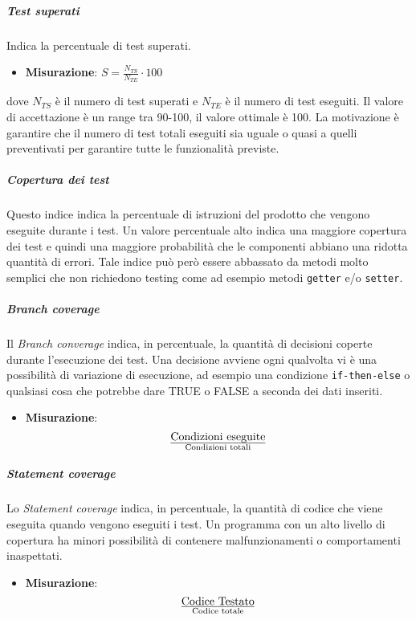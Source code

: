 \subparagraph{Test superati}

Indica la percentuale di test superati.
\begin{itemize}
	\item \textbf{Misurazione}: $S=\frac{N_{TS}}{N_{TE}} \cdot 100$
\end{itemize}
dove $N_{TS}$ è il numero di test superati e $N_{TE}$ è il numero di test eseguiti.
Il valore di accettazione è un range tra 90-100, il valore ottimale è 100. La motivazione è  garantire che il numero di test totali eseguiti sia uguale o quasi a quelli preventivati per garantire tutte le funzionalità previste. \\

\subparagraph{Copertura dei test}
Questo indice indica la percentuale di istruzioni del prodotto che vengono eseguite durante i test.
Un valore percentuale alto indica una maggiore copertura dei test e quindi una maggiore probabilità che le componenti abbiano una ridotta quantità di errori.
Tale indice può però essere abbassato da metodi molto semplici che non richiedono testing come ad esempio metodi \texttt{getter} e/o \texttt{setter}.

\subparagraph{Branch coverage}
Il \textit{Branch converage} indica, in percentuale, la quantità di decisioni coperte durante l'esecuzione dei test. Una decisione avviene ogni qualvolta vi è una possibilità di variazione di esecuzione, ad esempio una condizione \texttt{if-then-else} o qualsiasi cosa che potrebbe dare TRUE o FALSE a seconda dei dati inseriti.
\begin{itemize}
	\item \textbf{Misurazione}:
	\begin{displaymath}
	{\text{Condizioni eseguite}}\over{\text{Condizioni totali}}
	\end{displaymath} 
\end{itemize}

\subparagraph{Statement coverage}
Lo \textit{Statement coverage} indica, in percentuale, la quantità di codice che viene eseguita quando vengono eseguiti i test. Un programma con un alto livello di copertura ha minori possibilità di contenere malfunzionamenti o comportamenti inaspettati.
\begin{itemize}
	\item \textbf{Misurazione}:
	\begin{displaymath}
	{\text{Codice Testato}}\over{\text{Codice totale}}
	\end{displaymath} 
\end{itemize}


